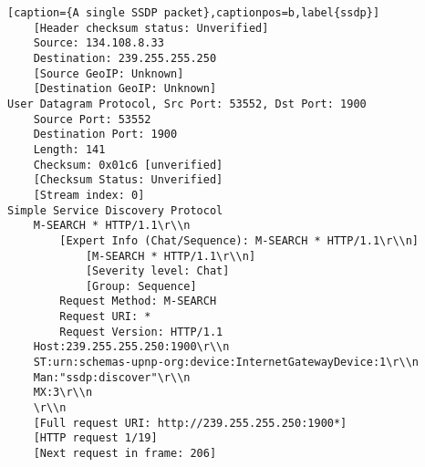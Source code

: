 \begin{lstlisting}[caption={A single SSDP packet},captionpos=b,label{ssdp}]
	[Header checksum status: Unverified]
	Source: 134.108.8.33
	Destination: 239.255.255.250
	[Source GeoIP: Unknown]
	[Destination GeoIP: Unknown]
User Datagram Protocol, Src Port: 53552, Dst Port: 1900
	Source Port: 53552
	Destination Port: 1900
	Length: 141
	Checksum: 0x01c6 [unverified]
	[Checksum Status: Unverified]
	[Stream index: 0]
Simple Service Discovery Protocol
	M-SEARCH * HTTP/1.1\r\\n
		[Expert Info (Chat/Sequence): M-SEARCH * HTTP/1.1\r\\n]
			[M-SEARCH * HTTP/1.1\r\\n]
			[Severity level: Chat]
			[Group: Sequence]
		Request Method: M-SEARCH
		Request URI: *
		Request Version: HTTP/1.1
	Host:239.255.255.250:1900\r\\n
	ST:urn:schemas-upnp-org:device:InternetGatewayDevice:1\r\\n
	Man:"ssdp:discover"\r\\n
	MX:3\r\\n
	\r\\n
	[Full request URI: http://239.255.255.250:1900*]
	[HTTP request 1/19]
	[Next request in frame: 206]

\end{lstlisting}
